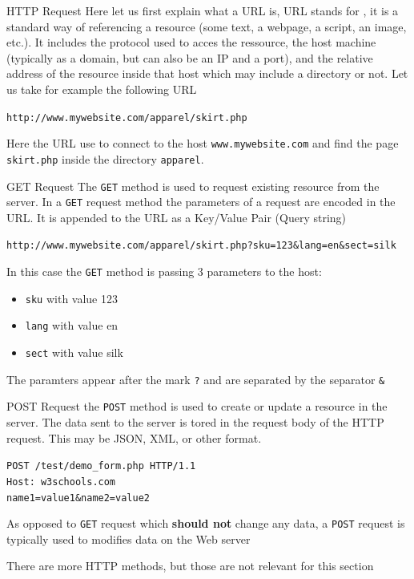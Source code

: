 \begin{parag}{HTTP Request}
    Here let us first explain what a URL is, URL stands for , it is a standard way of referencing a resource (some text, a webpage, a script, an image, etc.). It includes the protocol used to acces the ressource, the host machine (typically as a domain, but can also be an IP and a port), and the relative address of the resource inside that host which may include a directory or not. Let us take for example the following URL
	\begin{center}
		\texttt{http://www.mywebsite.com/apparel/skirt.php}
	\end{center}
	Here the URL use  to connect to the host \texttt{www.mywebsite.com} and find the page \texttt{skirt.php} inside the directory \texttt{apparel}.
\end{parag}
\begin{parag}{GET Request}
	The \texttt{GET} method is used to request existing resource from the server. In a \texttt{GET} request method the parameters of a request are encoded in the URL. It is appended to the URL as a Key/Value Pair (Query string)
	\begin{center}
		\texttt{http://www.mywebsite.com/apparel/skirt.php?sku=123\&lang=en\&sect=silk}
	\end{center}
	In this case the \texttt{GET} method is passing 3 parameters to the host:
	\begin{itemize}
		\item \texttt{sku} with value 123
		\item \texttt{lang} with value en
		\item \texttt{sect} with value silk
	\end{itemize}
	The paramters appear after the mark \texttt{?} and are separated by the separator \texttt{\&}
	
\end{parag}

\begin{parag}{POST Request}
    the \texttt{POST} method is used to create or update a resource in the server. The data sent to the server is tored in the request body of the HTTP request. This may be JSON, XML, or other format.
	\begin{center}
	    	\texttt{POST /test/demo\_form.php HTTP/1.1}\\
			\texttt{Host: w3schools.com}\\
			\texttt{name1=value1\&name2=value2}
	\end{center}
	As opposed to \texttt{GET} request which \textbf{should not} change any data,  a \texttt{POST} request is typically used to modifies data on the Web server
	
\end{parag}
\begin{framedremark}
There are more HTTP methods, but those are not relevant for this section
\end{framedremark}

